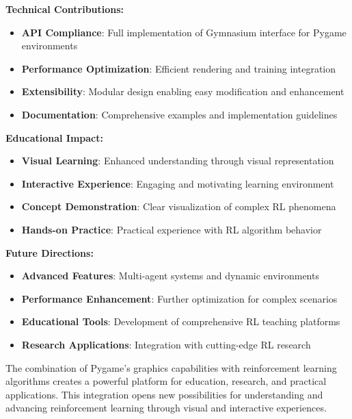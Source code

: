 \documentclass[12pt]{article}
\begin{document}
{{{\textbf{Technical Contributions:}
\begin{itemize}
    \item \textbf{API Compliance}: Full implementation of Gymnasium interface for Pygame environments
    \item \textbf{Performance Optimization}: Efficient rendering and training integration
    \item \textbf{Extensibility}: Modular design enabling easy modification and enhancement
    \item \textbf{Documentation}: Comprehensive examples and implementation guidelines
\end{itemize}

\textbf{Educational Impact:}
\begin{itemize}
    \item \textbf{Visual Learning}: Enhanced understanding through visual representation
    \item \textbf{Interactive Experience}: Engaging and motivating learning environment
    \item \textbf{Concept Demonstration}: Clear visualization of complex RL phenomena
    \item \textbf{Hands-on Practice}: Practical experience with RL algorithm behavior
\end{itemize}

\textbf{Future Directions:}
\begin{itemize}
    \item \textbf{Advanced Features}: Multi-agent systems and dynamic environments
    \item \textbf{Performance Enhancement}: Further optimization for complex scenarios
    \item \textbf{Educational Tools}: Development of comprehensive RL teaching platforms
    \item \textbf{Research Applications}: Integration with cutting-edge RL research
\end{itemize}

The combination of Pygame's graphics capabilities with reinforcement learning algorithms creates a powerful platform for education, research, and practical applications. This integration opens new possibilities for understanding and advancing reinforcement learning through visual and interactive experiences.

}}



\newpage

}
\end{document}
